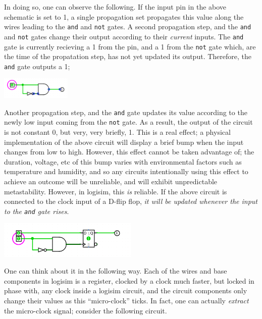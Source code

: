 \documentclass{article}
\def\gate#1{\uppercase{\Verb|#1|}}
\begin{document}
In doing so, one can observe the following. If the input pin in the above schematic is set to 1, a single propagation set propagates this value along the wires leading to the \gate{and} and \gate{not} gates. A second propagation step, and the \gate{and} and \gate{not} gates change their output according to their \textit{current} inputs. The \gate{and} gate is currently recieving a 1 from the pin, and a 1 from the \gate{not} gate which, are the time of the propatation step, has not yet updated its output. Therefore, the \gate{and} gate outputs a 1;

	\begin{center}\includegraphics[width=0.25\textwidth]{images/spurious_1.png}\end{center}

Another propagation step, and the \gate{and} gate updates its value according to the newly low input coming from the \gate{not} gate. As a result, the output of the circuit is not constant 0, but very, very briefly, 1. This is a real effect; a physical implementation of the above circuit will display a brief bump when the input changes from low to high. However, this effect cannot be taken advantage of; the duration, voltage, etc of this bump varies with environmental factors such as temperature and humidity, and so any circuits intentionally using this effect to achieve an outcome will be unreliable, and will exhibit unpredictable metastability. However, in logisim, this \textit{is} reliable. If the above circuit is connected to the clock input of a D-flip flop, \textit{it will be updated whenever the input to the \gate{and} gate rises}.

	\begin{center}\includegraphics[width=0.5\textwidth]{images/spurious_clock.png}\end{center}

One can think about it in the following way. Each of the wires and base components in logisim is a register, clocked by a clock much faster, but locked in phase with, any clock inside a logisim circuit, and the circuit components only change their values as this ``micro-clock'' ticks. In fact, one can actually \textit{extract} the micro-clock signal; consider the following circuit.
\end{document}
